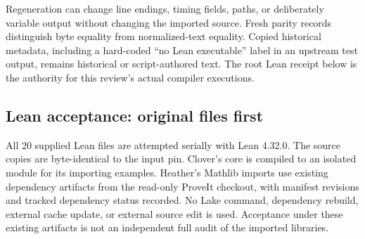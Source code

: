\documentclass[11pt,letterpaper]{article}
\theoremstyle{definition}\newtheorem{definition}[proposition]{Definition}
\theoremstyle{remark}\newtheorem{remark}[proposition]{Remark}
\begin{document}
Regeneration can change line endings, timing fields, paths, or deliberately
variable output without changing the imported source. Fresh parity records
distinguish byte equality from normalized-text equality. Copied historical
metadata, including a hard-coded ``no Lean executable'' label in an upstream
test output, remains historical or script-authored text. The root Lean receipt
below is the authority for this review's actual compiler executions.

\subsection{Lean acceptance: original files first}

All 20 supplied Lean files are attempted serially with Lean 4.32.0. The source
copies are byte-identical to the input pin. Clover's core is compiled to an
isolated module for its importing examples. Heather's Mathlib imports use
existing dependency artifacts from the read-only ProveIt checkout, with
manifest revisions and tracked dependency status recorded. No Lake command,
dependency rebuild, external cache update, or external source edit is used.
Acceptance under these existing artifacts is not an independent full audit
of the imported libraries.
\end{document}
